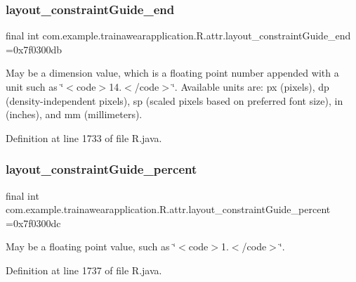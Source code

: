 \subsubsection{\texorpdfstring{layout\_constraintGuide\_end}{layout\_constraintGuide\_end}}
{\footnotesize\ttfamily final int com.\+example.\+trainawearapplication.\+R.\+attr.\+layout\+\_\+constraint\+Guide\+\_\+end =0x7f0300db\hspace{0.3cm}{\ttfamily [static]}}

May be a dimension value, which is a floating point number appended with a unit such as \char`\"{}$<$code$>$14.\+5sp$<$/code$>$\char`\"{}. Available units are\+: px (pixels), dp (density-\/independent pixels), sp (scaled pixels based on preferred font size), in (inches), and mm (millimeters). 

Definition at line 1733 of file R.\+java.

\mbox{\label{classcom_1_1example_1_1trainawearapplication_1_1_r_1_1attr_a70b3288b97ea3bada8dfb40608d855e0}} 
\subsubsection{\texorpdfstring{layout\_constraintGuide\_percent}{layout\_constraintGuide\_percent}}
{\footnotesize\ttfamily final int com.\+example.\+trainawearapplication.\+R.\+attr.\+layout\+\_\+constraint\+Guide\+\_\+percent =0x7f0300dc\hspace{0.3cm}{\ttfamily [static]}}

May be a floating point value, such as \char`\"{}$<$code$>$1.$<$/code$>$\char`\"{}. 

Definition at line 1737 of file R.\+java.

\mbox{\label{classcom_1_1example_1_1trainawearapplication_1_1_r_1_1attr_a3c743d4cbefab1c22ca077f9fa6ee7f3}} 
